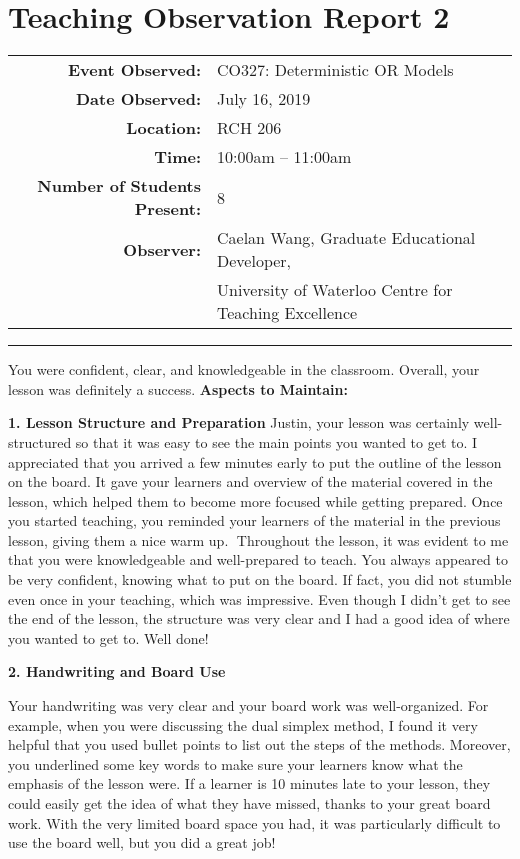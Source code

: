 \documentclass{article}
\begin{document}
\section{Teaching Observation Report 2}\label{sec:observation-report-2}
\begin{tabular}{r l}
    \textbf{Event Observed:}&	CO327: Deterministic OR Models\\
    \textbf{Date Observed:}&	July 16, 2019\\
    \textbf{Location:}&	RCH 206\\
    \textbf{Time:}&	10:00am – 11:00am\\
    \textbf{Number of Students Present:}&	8\\
    \textbf{Observer:}&	Caelan Wang, Graduate Educational Developer,\\
         &University of Waterloo Centre for Teaching Excellence
\end{tabular}

\rule{\linewidth}{0.25mm}
You were confident, clear, and knowledgeable in the classroom. Overall, your lesson was definitely a success.\newline
\textbf{Aspects to Maintain:}

\textbf{1. Lesson Structure and Preparation}
Justin, your lesson was certainly well-structured so that it was easy to see the main points you wanted to get to. I appreciated that you arrived a few minutes early to put the outline of the lesson on the board. It gave your learners and overview of the material covered in the lesson, which helped them to become more focused while getting prepared. Once you started teaching, you reminded your learners of the material in the previous lesson, giving them a nice warm up.
Throughout the lesson, it was evident to me that you were knowledgeable and well-prepared to teach. You always appeared to be very confident, knowing what to put on the board. If fact, you did not stumble even once in your teaching, which was impressive. Even though I didn’t get to see the end of the lesson, the structure was very clear and I had a good idea of where you wanted to get to. Well done!

\textbf{2. Handwriting and Board Use}

Your handwriting was very clear and your board work was well-organized. For example, when you were discussing the dual simplex method, I found it very helpful that you used bullet points to list out the steps of the methods. Moreover, you underlined some key words to make sure your learners know what the emphasis of the lesson were. If a learner is 10 minutes late to your lesson, they could easily get the idea of what they have missed, thanks to your great board work. With the very limited board space you had, it was particularly difficult to use the board well, but you did a great job!
\end{document}
